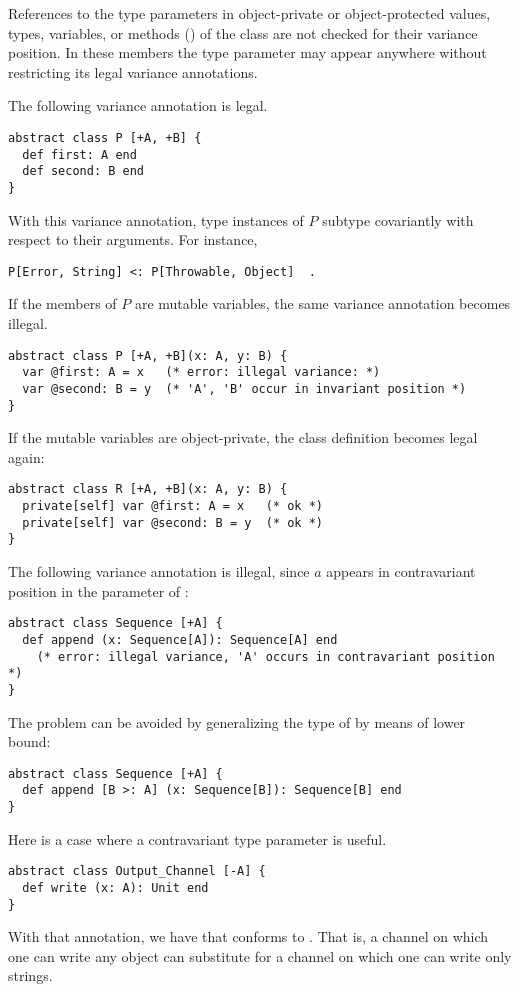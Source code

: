 References to the type parameters in object-private or object-protected values, types, variables, or methods () of the class are not checked for their variance position. In these members the type parameter may appear anywhere without restricting its legal variance annotations. 

\example The following variance annotation is legal. 
\begin{lstlisting}
abstract class P [+A, +B] {
  def first: A end
  def second: B end
}
\end{lstlisting}
With this variance annotation, type instances of $P$ subtype covariantly with respect to their arguments. For instance, 
\begin{lstlisting}
P[Error, String] <: P[Throwable, Object]  .
\end{lstlisting}
If the members of $P$ are mutable variables, the same variance annotation becomes illegal. 
\begin{lstlisting}
abstract class P [+A, +B](x: A, y: B) {
  var @first: A = x   (* error: illegal variance: *)
  var @second: B = y  (* 'A', 'B' occur in invariant position *)
}
\end{lstlisting}
If the mutable variables are object-private, the class definition becomes legal again: 
\begin{lstlisting}
abstract class R [+A, +B](x: A, y: B) {
  private[self] var @first: A = x   (* ok *)
  private[self] var @second: B = y  (* ok *)
}
\end{lstlisting}

\example The following variance annotation is illegal, since $a$ appears in contravariant position in the parameter of :
\begin{lstlisting}
abstract class Sequence [+A] {
  def append (x: Sequence[A]): Sequence[A] end
    (* error: illegal variance, 'A' occurs in contravariant position *)
}
\end{lstlisting}
The problem can be avoided by generalizing the type of  by means of lower bound:
\begin{lstlisting}
abstract class Sequence [+A] {
  def append [B >: A] (x: Sequence[B]): Sequence[B] end
}
\end{lstlisting}

\example Here is a case where a contravariant type parameter is useful. 
\begin{lstlisting}
abstract class Output_Channel [-A] {
  def write (x: A): Unit end
}
\end{lstlisting}
With that annotation, we have that  conforms to . That is, a channel on which one can write any object can substitute for a channel on which one can write only strings. 




